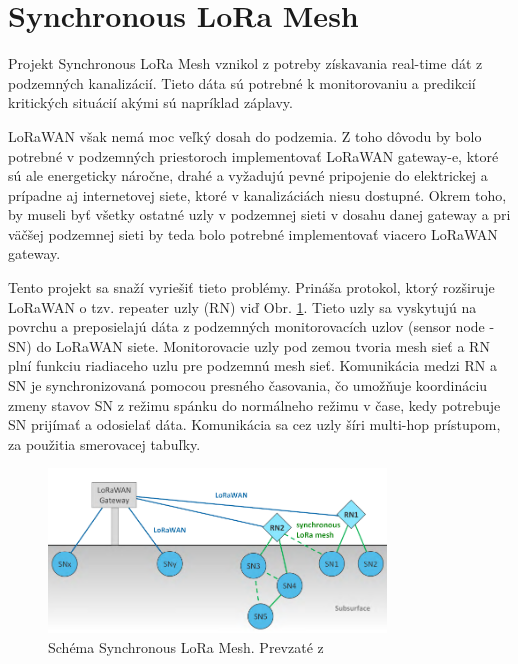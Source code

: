 \documentclass[slovak,master]{diploma}
\begin{document}
\section{Synchronous LoRa Mesh}
Projekt Synchronous LoRa Mesh \cite{synchronouslorameshnetwork} vznikol z potreby získavania real-time dát z podzemných kanalizácií. Tieto dáta sú potrebné k monitorovaniu a predikcií kritických situácií akými 
sú napríklad záplavy.

LoRaWAN však nemá moc veľký dosah do podzemia. Z toho dôvodu by bolo potrebné v podzemných priestoroch implementovať LoRaWAN gateway-e, ktoré sú ale energeticky náročne, drahé a vyžadujú 
pevné pripojenie do elektrickej a prípadne aj internetovej siete, ktoré v kanalizáciách niesu dostupné. Okrem toho, by museli byť všetky ostatné uzly v podzemnej sieti v dosahu danej gateway a pri väčšej podzemnej sieti 
by teda bolo potrebné implementovať viacero LoRaWAN gateway.

Tento projekt sa snaží vyriešiť tieto problémy. Prináša protokol, ktorý rozširuje LoRaWAN o tzv. repeater uzly (RN) viď Obr. \ref{fig:synchronouslora}. Tieto uzly sa vyskytujú na povrchu a preposielajú dáta z 
podzemných monitorovacích uzlov (sensor node  - SN) do LoRaWAN siete. Monitorovacie uzly pod zemou tvoria mesh sieť a RN plní funkciu riadiaceho uzlu pre podzemnú mesh sieť. 
Komunikácia medzi RN a SN je synchronizovaná pomocou presného časovania, čo umožňuje koordináciu zmeny stavov SN z režimu spánku do normálneho režimu v čase, kedy 
potrebuje SN prijímať a odosielať dáta. Komunikácia sa cez uzly šíri multi-hop prístupom, za použitia smerovacej tabuľky.

\begin{figure}[h!]
	\centering
	\includegraphics[width=0.8\textwidth]{Figures/synchronouslorameshnetwork.png}
	\caption[Schéma Synchronous LoRa Mesh]{Schéma Synchronous LoRa Mesh. Prevzaté z \cite{synchronouslorameshnetwork}}
	\label{fig:synchronouslora}
\end{figure}
\end{document}
